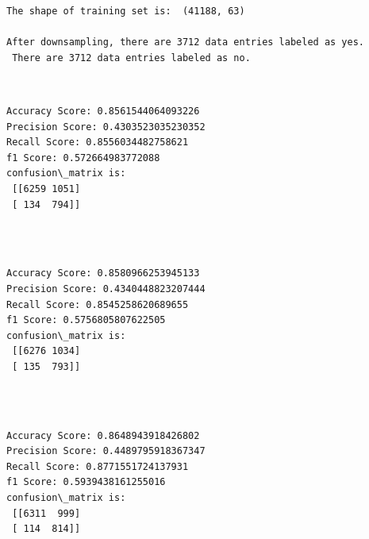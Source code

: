 \documentclass[11pt]{article}
\begin{document}
    \begin{Verbatim}[commandchars=\\\{\}]
The shape of training set is:  (41188, 63) 

After downsampling, there are 3712 data entries labeled as yes.
 There are 3712 data entries labeled as no.

    \end{Verbatim}

    \begin{center}
    \end{center}
    { \hspace*{\fill} \\}
    
    \begin{Verbatim}[commandchars=\\\{\}]
Accuracy Score: 0.8561544064093226
Precision Score: 0.4303523035230352
Recall Score: 0.8556034482758621
f1 Score: 0.572664983772088
confusion\_matrix is: 
 [[6259 1051]
 [ 134  794]] 


    \end{Verbatim}

   

    \begin{center}
    \end{center}
    { \hspace*{\fill} \\}
    
    \begin{Verbatim}[commandchars=\\\{\}]
Accuracy Score: 0.8580966253945133
Precision Score: 0.4340448823207444
Recall Score: 0.8545258620689655
f1 Score: 0.5756805807622505
confusion\_matrix is: 
 [[6276 1034]
 [ 135  793]] 


    \end{Verbatim}


    \begin{center}
    \end{center}
    { \hspace*{\fill} \\}
    
    \begin{Verbatim}[commandchars=\\\{\}]
Accuracy Score: 0.8648943918426802
Precision Score: 0.4489795918367347
Recall Score: 0.8771551724137931
f1 Score: 0.5939438161255016
confusion\_matrix is: 
 [[6311  999]
 [ 114  814]] 


    \end{Verbatim}
\end{document}
